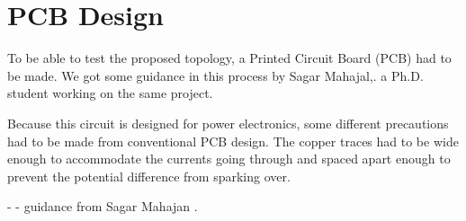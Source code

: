 \section{PCB Design}\label{ch:PCB}

To be able to test the proposed topology,
a Printed Circuit Board (PCB) had to be made.
We got some guidance in this process by Sagar Mahajal,.
a Ph.D. student working on the same project.

Because this circuit is designed for power electronics,
some different precautions had to be made from conventional PCB design.
The copper traces had to be wide enough to accommodate the currents going through
and spaced apart enough to prevent the potential difference from sparking over.




- 
- guidance from Sagar Mahajan .

